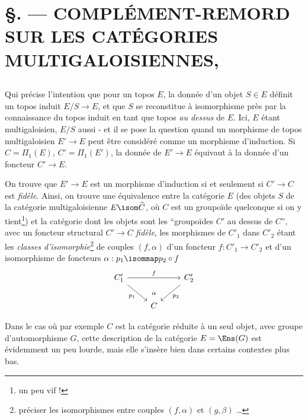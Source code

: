 \chapter*{\S {}. --- COMPLÉMENT-REMORD SUR LES CATÉGORIES MULTIGALOISIENNES,}\thispagestyle{empty}
\label{sec:4}
\section*{}



Qui précise l'intention que pour un topos $E$, la donnée d'un objet $S \in E$ définit un topos induit
$E/S \to E$, et que $S$ se reconstitue à isomorphisme près par la connaissance du topos induit en 
tant que topos \emph{au dessus} de $E$. Ici, $E$ étant multigaloisien, $E/S$ aussi - et il se pose la 
question quand un morphisme de topos multigaloisien $E' \to E$ peut être considéré comme un morphisme
d'induction. Si $C = \Pi_1(E)$, $C' = \Pi_1(E')$, la donnée de $E' \to E$ équivaut à la donnée d'un 
foncteur $C' \to E$.

On trouve que $E' \to E$ est un morphisme d'induction si et seulement si $C' \to C$ est \emph{fidèle}.
Ainsi, on trouve une équivalence entre la catégorie $E$ (des objets $S$ de la catégorie multigaloisienne
$E \isom \widehat{C}$, où $C$ est un groupoïde quelconque si on y tient\footnote{un peu vif !}) et la
catégorie dont les objets sont les ``groupoïdes $C'$ au dessus de $C$'', avec un foncteur structural 
$C' \to C$ \emph{fidèle}, les morphismes de $C'_1$ dans $C'_2$ étant les \emph{classes d'isomorphie}\footnote{préciser les isomorphismes entre couples $(f, \alpha)$ et $(g, \beta)$ \dots} de couples
$(f, \alpha)$ d'un foncteur $f: C'_1 \to C'_2$ et d'un isomorphisme de foncteurs 
$\alpha: p_1 \isommap p_2 \circ f$
\[\begin{tikzcd}
	{C'_1} && {C'_2} \\
	& C
	\arrow["f", from=1-1, to=1-3]
	\arrow[""{name=0, anchor=center, inner sep=0}, "{p_2}", from=1-3, to=2-2]
	\arrow[""{name=1, anchor=center, inner sep=0}, "{p_1}"', from=1-1, to=2-2]
	\arrow["\alpha", shift right=2, draw=none, from=1, to=0]
\end{tikzcd}\]

Dans le cas où par exemple $C$ est la catégorie réduite à un seul objet, avec groupe d'automorphisme $G$,
cette description de la catégorie $E = \Ens(G)$ est évidemment un peu lourde, mais elle s'insère bien dans certains contextes plus bas.

